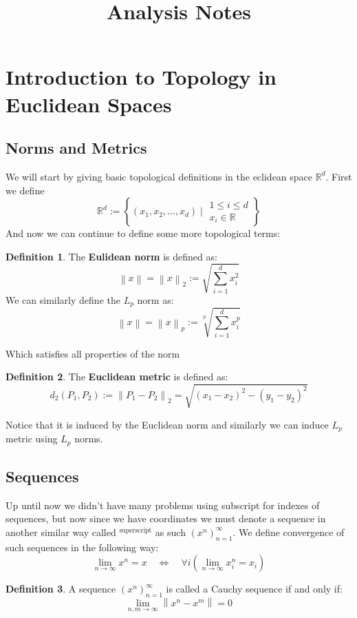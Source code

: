 \documentclass[11pt,a4paper]{article}
\title{\textbf{Analysis Notes}}
\author{}
\date{}
\theoremstyle{definition}
\newtheorem{definition}{Definition}[section]
\theoremstyle{plain}
\newcommand{\R}{\mathbb{R}}
\newcommand{\set}[2]{ \left\{ #1 \mid #2 \right\} }
\newcommand{\norm}[1]{\left\lVert #1\right\rVert}
\begin{document}
	\maketitle
	\newpage
	\section{Introduction to Topology in Euclidean Spaces}
	\subsection{Norms and Metrics}
  We will start by giving basic topological definitions in the eclidean
	space $\R^d$. First we define
	\[
		\R^d := \set{(x_1,x_2,\dots,x_d)}{\substack{1 \le i \le d \\ x_i\in\R}}
	\]
	And now we can continue to define some more topological terms:
	\begin{definition}
	The \textbf{Eulidean norm} is defined as:
	\[
    \norm{x} = \norm{x}_2 := \sqrt{\sum_{i=1}^{d}{x_i^2}}
	\]
	We can similarly define the $L_p$ norm as:
	\[
    \norm{x} = \norm{x}_p := \sqrt[p]{\sum_{i=1}^{d}{x_i^p}}
	\]
	\end{definition}
	\noindent Which satisfies all properties of the norm
	\begin{definition}
	The \textbf{Euclidean metric} is defined as:
	\[
    d_2(P_1,P_2) := \norm{P_1-P_2}_2 = \sqrt{(x_1-x_2)^2 - (y_1-y_2)^2}
	\]
	\end{definition}
	\noindent Notice that it is induced by the Euclidean norm and similarly
	we can induce $L_p$ metric using $L_p$ norms.
	\subsection{Sequences}
	Up until now we didn't have many problems using subscript for indexes
	of sequences, but now since we have coordinates we must denote a sequence
	in another similar way called $^{\text{superscript}}$ as such 
  $(x^n)_{n=1}^{\infty}$. We define convergence of such sequences in
  the following way:
	\[
		\lim_{n\to\infty}{x^n} = x 
		\quad \iff \quad
		\forall i\left(\lim_{n\to\infty}{x_i^n} = x_i\right)
	\]
	\begin{definition}
	A sequence $(x^n)_{n=1}^{\infty}$ is called a Cauchy sequence if and only 
	if:
	\[
    \lim_{n,m \to \infty}{\norm{x^n - x^m}} = 0
	\]
	\end{definition}
	
	\newpage
	
\end{document}

